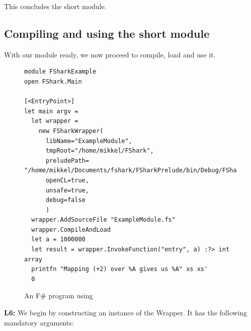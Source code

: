 This concludes the short \fshark{} module.
\clearpage

\subsection{Compiling and using the short \fshark{} module}
\label{compilingandusingfsharkmodule}
With our \fshark{} module ready, we now proceed to compile, load and use it.
\begin{figure}[h]
  \centering
    \begin{verbatim}
module FSharkExample
open FShark.Main

[<EntryPoint>]
let main argv =
  let wrapper = 
    new FSharkWrapper(
      libName="ExampleModule",
      tmpRoot="/home/mikkel/FShark",
      preludePath= "/home/mikkel/Documents/fshark/FSharkPrelude/bin/Debug/FSharkPrelude.dll",
      openCL=true,
      unsafe=true,
      debug=false
      )
  wrapper.AddSourceFile "ExampleModule.fs"
  wrapper.CompileAndLoad
  let a = 1000000
  let result = wrapper.InvokeFunction("entry", a) :?> int array
  printfn "Mapping (+2) over %A gives us %A" xs xs'
  0
    \end{verbatim}
  \caption{An F\# program using \fshark{}}
  \label{fig:fsharkusageexample}
\end{figure}

\textbf{L6:} We begin by constructing an instance of the \fshark{}Wrapper. It has the following
mandatory arguments:

